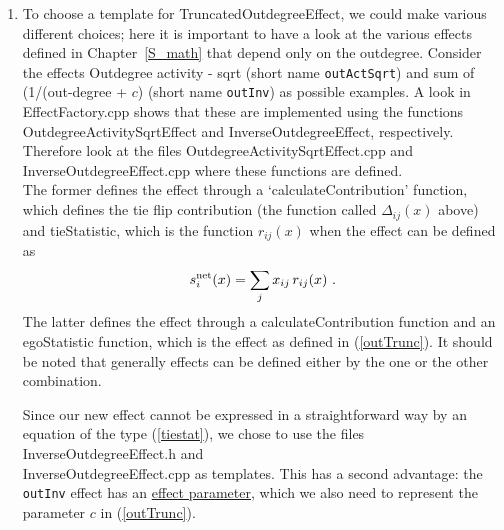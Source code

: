 \documentclass[a4paper,fleqn,11pt]{article}
\newcommand{\+}{\, + \,}
\newcommand{\sfn}[1]{\textsf{#1}}
\begin{document}
{\begin{enumerate}
      In the file \textsf{EffectFactory.cpp}, after the piece referring
      to \texttt{effectName == "outActSqrt"}, the lines
\begin{verbatim}
    else if (effectName == "outTrunc")
    {
         pEffect = new TruncatedOutdegreeEffect(pEffectInfo);
    }
\end{verbatim}
      were inserted.  This refers the program, when it encounters short name
      \sfn{outTrunc}, to the function \sfn{TruncatedOutdegreeEffect}.  The next
      step was to construct this function.
\item To choose a template for \sfn{TruncatedOutdegreeEffect},
      we could make various
      different choices; here it is important to have a look at the various
      effects defined in Chapter~\ref{S_math} that depend only on the
      outdegree. Consider the effects Outdegree activity - sqrt
      (short name \texttt{outActSqrt})
      and sum of (1/(out-degree + $c$) (short name \texttt{outInv})
      as possible examples.
      A look in  \textsf{EffectFactory.cpp} shows that these are implemented
      using the functions
      \textsf{OutdegreeActivitySqrtEffect}
      and \textsf{InverseOutdegreeEffect}, respectively.
      Therefore look at the files \textsf{OutdegreeActivitySqrtEffect.cpp}
      and \textsf{InverseOutdegreeEffect.cpp} where these functions
      are defined.\\
      The former defines the effect through a
      `\sfn{calculateContribution}' function, which defines the
      tie flip contribution
      (the function called $\Delta_{ij}(x)$ above)
      and \sfn{tieStatistic}, which is the function $r_{ij}(x)$
      when the effect can be defined as
      \begin{equation}
       s^{\rm net}_{i}(x) = \sum_j x_{ij}\,r_{ij}(x) \ .  \label{tiestat}
      \end{equation}
      The latter defines the effect through  a
      \sfn{calculateContribution} function and an\\
      \sfn{egoStatistic} function, which is the effect
      as defined in (\ref{outTrunc}). It should be noted that
      generally effects can be defined either by the one or the other
      combination.


      Since our new effect cannot be expressed in a straightforward way
      by an equation of the type (\ref{tiestat}), we chose to use
      the files \textsf{InverseOutdegreeEffect.h} and\\
      \textsf{InverseOutdegreeEffect.cpp} as templates.
      This has a second advantage: the  \texttt{outInv} effect has an
      \hyperlink{T_effpar}{effect parameter}, which we also need
      to represent the parameter $c$ in  (\ref{outTrunc}).


\end{enumerate}}
\end{document}
